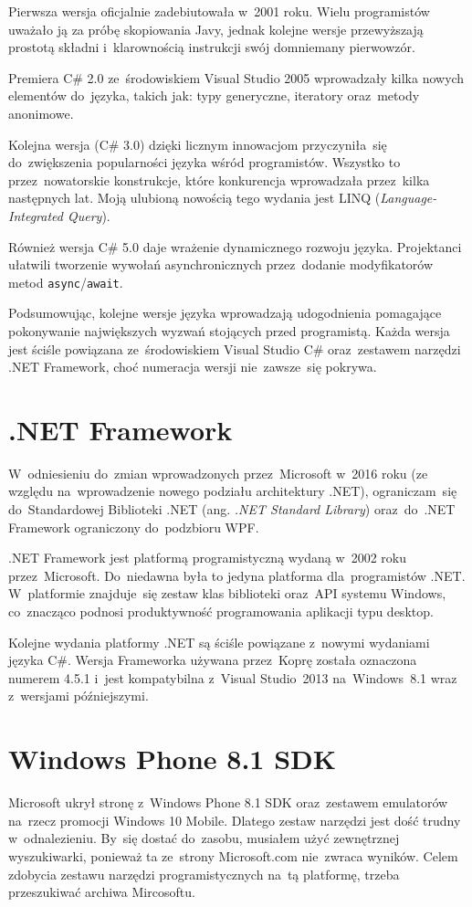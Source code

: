 \documentclass[a4paper,twoside,titlepage,openright]{book}
\begin{document}
Pierwsza wersja oficjalnie zadebiutowała w~2001 roku. Wielu programistów uważało ją za próbę skopiowania Javy, jednak kolejne wersje przewyższają prostotą składni i~klarownością instrukcji swój domniemany pierwowzór. 

Premiera C\# 2.0 ze~środowiskiem Visual Studio 2005 wprowadzały kilka nowych elementów do~języka, takich jak: typy generyczne, iteratory oraz~metody anonimowe. 

Kolejna wersja (C\# 3.0) dzięki licznym innowacjom przyczyniła~się do~zwiększenia popularności języka wśród programistów. Wszystko to przez~nowatorskie konstrukcje, które konkurencja wprowadzała przez~kilka następnych lat. Moją ulubioną nowością tego wydania jest LINQ (\textit{Language-Integrated Query}). 

Również wersja C\# 5.0 daje wrażenie dynamicznego rozwoju języka. Projektanci ułatwili tworzenie wywołań asynchronicznych przez~dodanie modyfikatorów metod \texttt{async}/\texttt{await}. 

Podsumowując, kolejne wersje języka wprowadzają udogodnienia pomagające pokonywanie największych wyzwań stojących przed programistą. Każda wersja jest ściśle powiązana ze~środowiskiem Visual Studio C\# oraz~zestawem narzędzi .NET Framework, choć numeracja wersji nie~zawsze~się pokrywa.

\section{.NET Framework}
W~odniesieniu do~zmian wprowadzonych przez~Microsoft w~2016 roku (ze względu na~wprowadzenie nowego podziału architektury .NET), ograniczam~się do~Standardowej Biblioteki .NET (ang. \textit{.NET Standard Library}) oraz~do~.NET Framework ograniczony do~podzbioru WPF.\cite{dotnetArtykul} 

.NET Framework jest platformą programistyczną wydaną w~2002 roku przez~Microsoft. Do~niedawna była to jedyna platforma dla~programistów .NET.\cite{dotnetArtykul}  W~platformie znajduje~się zestaw klas biblioteki oraz~API systemu Windows, co~znacząco podnosi produktywność programowania aplikacji typu desktop. 

Kolejne wydania platformy .NET są ściśle powiązane z~nowymi wydaniami języka C\#. Wersja Frameworka używana przez~Koprę została oznaczona numerem 4.5.1 i~jest kompatybilna z~Visual Studio~2013 na~Windows~8.1 wraz z~wersjami późniejszymi. 


\section{Windows Phone 8.1 SDK}
Microsoft ukrył stronę z~Windows Phone 8.1 SDK oraz~zestawem emulatorów na~rzecz promocji Windows 10 Mobile. Dlatego zestaw narzędzi jest dość trudny w~odnalezieniu. By~się dostać do~zasobu, musiałem użyć zewnętrznej wyszukiwarki, ponieważ ta ze~strony Microsoft.com nie~zwraca wyników. Celem zdobycia zestawu narzędzi programistycznych na~tą platformę, trzeba przeszukiwać archiwa Mircosoftu. \cite{tajneArchiwaMicrosoftu} 
\end{document}
